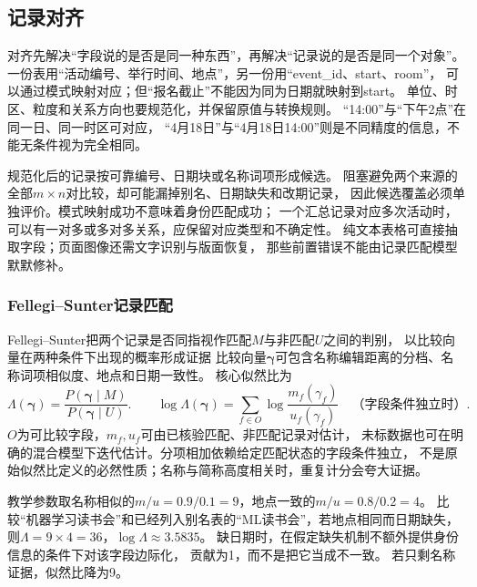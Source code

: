 \FloatBarrier
\subsection{记录对齐}
\label{sec:nlp-extraction-alignment}

对齐先解决“字段说的是否是同一种东西”，再解决“记录说的是否是同一个对象”。
一份表用“活动编号、举行时间、地点”，另一份用“event\_id、start、room”，
可以通过模式映射对应；但“报名截止”不能因为同为日期就映射到start。
单位、时区、粒度和关系方向也要规范化，并保留原值与转换规则。
“14:00”与“下午2点”在同一日、同一时区可对应，
“4月18日”与“4月18日14:00”则是不同精度的信息，不能无条件视为完全相同。

规范化后的记录按可靠编号、日期块或名称词项形成候选。
阻塞避免两个来源的全部$m\times n$对比较，却可能漏掉别名、日期缺失和改期记录，
因此候选覆盖必须单独评价。模式映射成功不意味着身份匹配成功；
一个汇总记录对应多次活动时，可以有一对多或多对多关系，应保留对应类型和不确定性。
纯文本表格可直接抽取字段；页面图像还需文字识别与版面恢复，
那些前置错误不能由记录匹配模型默默修补。

\subsubsection{Fellegi--Sunter记录匹配}
\label{sec:nlp-extraction-fellegi-sunter}

Fellegi--Sunter把两个记录是否同指视作匹配$M$与非匹配$U$之间的判别，
以比较向量在两种条件下出现的概率形成证据
比较向量$\bm{\gamma}$可包含名称编辑距离的分档、名称词项相似度、地点和日期一致性。
核心似然比为
\begin{equation}
  \Lambda(\bm{\gamma})=
  \frac{P(\bm{\gamma}\mid M)}{P(\bm{\gamma}\mid U)}.
  \qquad
  \log\Lambda(\bm{\gamma})
    =\sum_{f\in O}
       \log\frac{m_f(\gamma_f)}{u_f(\gamma_f)}
       \quad\text{（字段条件独立时）}.
  \label{eq:nlp-extraction-fellegi}
\end{equation}
$O$为可比较字段，$m_f,u_f$可由已核验匹配、非匹配记录对估计，
未标数据也可在明确的混合模型下迭代估计。分项相加依赖给定匹配状态的字段条件独立，
不是原始似然比定义的必然性质；名称与简称高度相关时，重复计分会夸大证据。

教学参数取名称相似的$m/u=0.9/0.1=9$，地点一致的$m/u=0.8/0.2=4$。
比较“机器学习读书会”和已经列入别名表的“ML读书会”，若地点相同而日期缺失，
则$\Lambda=9\times4=36$，$\log\Lambda\approx3.5835$。
缺日期时，在假定缺失机制不额外提供身份信息的条件下对该字段边际化，
贡献为1，而不是把它当成不一致。
若只剩名称证据，似然比降为9。

